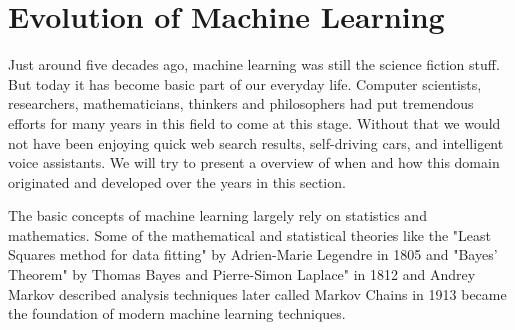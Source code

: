 \section{Evolution of Machine Learning}
Just around five decades ago, machine learning was still the science fiction stuff. But today it has become basic part of our everyday life. Computer scientists, researchers, mathematicians, thinkers and philosophers had put tremendous efforts for many years in this field to come at this stage. Without that we would not have been enjoying quick web search results, self-driving cars, and intelligent voice assistants. We will try to present a overview of when and how this domain originated and developed over the years in this section.
\newline
\par
The basic concepts of machine learning largely rely on statistics and mathematics. Some of the mathematical and statistical theories like the "Least Squares method for data fitting" by Adrien-Marie Legendre in 1805 and "Bayes' Theorem" by Thomas Bayes and Pierre-Simon Laplace" in 1812 and Andrey Markov described analysis techniques later called Markov Chains in 1913 \cite{ml_history} became the foundation of modern machine learning techniques.
\newline

